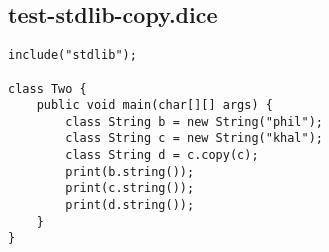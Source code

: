 \subsection{test-stdlib-copy.dice}
\begin{verbatim}
include("stdlib");

class Two {
	public void main(char[][] args) {
        class String b = new String("phil");
        class String c = new String("khal");
        class String d = c.copy(c);
        print(b.string());
        print(c.string());
        print(d.string());
	}
}
\end{verbatim}